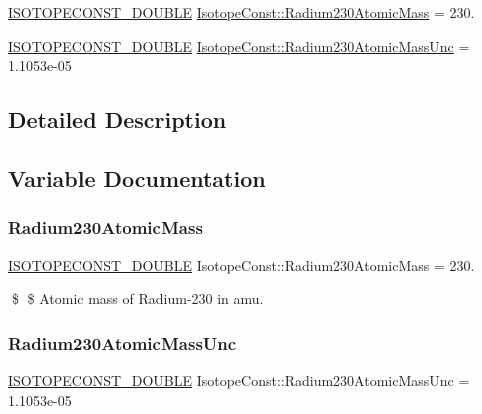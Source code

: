 \begin{DoxyCompactItemize}
\item 
\mbox{\hyperlink{group___isotope_const-_macros_ga8f45a7272ce02c0b4c65c44636ed719a}{I\+S\+O\+T\+O\+P\+E\+C\+O\+N\+S\+T\+\_\+\+D\+O\+U\+B\+LE}} \mbox{\hyperlink{group___isotope_const-_radium-_ra230_ga7614ec980070417d1c923a49db417232}{Isotope\+Const\+::\+Radium230\+Atomic\+Mass}} = 230.
\item 
\mbox{\hyperlink{group___isotope_const-_macros_ga8f45a7272ce02c0b4c65c44636ed719a}{I\+S\+O\+T\+O\+P\+E\+C\+O\+N\+S\+T\+\_\+\+D\+O\+U\+B\+LE}} \mbox{\hyperlink{group___isotope_const-_radium-_ra230_ga18227186a3920535f2e0df306756f9c0}{Isotope\+Const\+::\+Radium230\+Atomic\+Mass\+Unc}} = 1.\+1053e-\/05
\end{DoxyCompactItemize}


\subsection{Detailed Description}


\subsection{Variable Documentation}
\mbox{\label{group___isotope_const-_radium-_ra230_ga7614ec980070417d1c923a49db417232}} 
\subsubsection{\texorpdfstring{Radium230\+Atomic\+Mass}{Radium230AtomicMass}}
{\footnotesize\ttfamily \mbox{\hyperlink{group___isotope_const-_macros_ga8f45a7272ce02c0b4c65c44636ed719a}{I\+S\+O\+T\+O\+P\+E\+C\+O\+N\+S\+T\+\_\+\+D\+O\+U\+B\+LE}} Isotope\+Const\+::\+Radium230\+Atomic\+Mass = 230.}

\$ \$ Atomic mass of Radium-\/230 in amu. \mbox{\label{group___isotope_const-_radium-_ra230_ga18227186a3920535f2e0df306756f9c0}} 
\subsubsection{\texorpdfstring{Radium230\+Atomic\+Mass\+Unc}{Radium230AtomicMassUnc}}
{\footnotesize\ttfamily \mbox{\hyperlink{group___isotope_const-_macros_ga8f45a7272ce02c0b4c65c44636ed719a}{I\+S\+O\+T\+O\+P\+E\+C\+O\+N\+S\+T\+\_\+\+D\+O\+U\+B\+LE}} Isotope\+Const\+::\+Radium230\+Atomic\+Mass\+Unc = 1.\+1053e-\/05}

